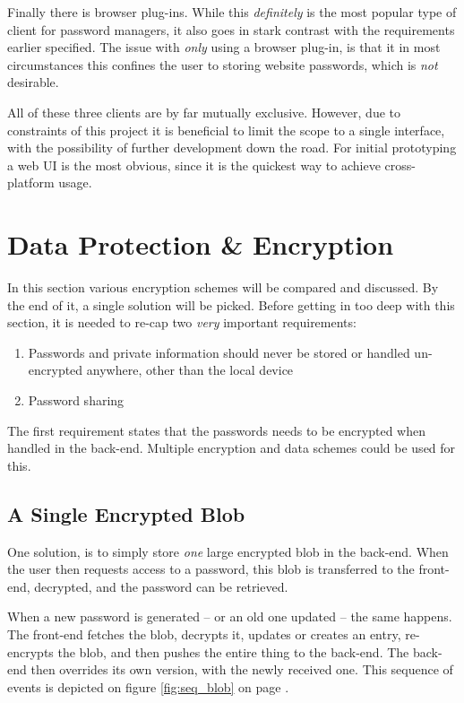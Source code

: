 		Finally there is browser plug-ins. While this \emph{definitely} is the most popular type of client for password managers, it also goes in stark contrast with the requirements earlier specified. The issue with \emph{only} using a browser plug-in, is that it in most circumstances this confines the user to storing website passwords, which is \emph{not} desirable.

		All of these three clients are by far mutually exclusive. However, due to constraints of this project it is beneficial to limit the scope to a single interface, with the possibility of further development down the road. For initial prototyping a web UI is the most obvious, since it is the quickest way to achieve cross-platform usage. 

	\section{Data Protection \& Encryption}
		In this section various encryption schemes will be compared and discussed. By the end of it, a single solution will be picked. Before getting in too deep with this section, it is needed to re-cap two \emph{very} important requirements:
		\begin{enumerate}
			\item Passwords and private information should never be stored or handled un-encrypted anywhere, other than the local device
			\item Password sharing
		\end{enumerate}

		The first requirement states that the passwords needs to be encrypted when handled in the back-end. Multiple encryption and data schemes could be used for this.

		\subsection{A Single Encrypted Blob}
			One solution, is to simply store \emph{one} large encrypted blob in the back-end. When the user then requests access to a password, this blob is transferred to the front-end, decrypted, and the password can be retrieved. 

			When a new password is generated -- or an old one updated -- the same happens. The front-end fetches the blob, decrypts it, updates or creates an entry, re-encrypts the blob, and then pushes the entire thing to the back-end. The back-end then overrides its own version, with the newly received one. This sequence of events is depicted on figure \ref{fig:seq_blob} on page \pageref{fig:seq_blob}.


